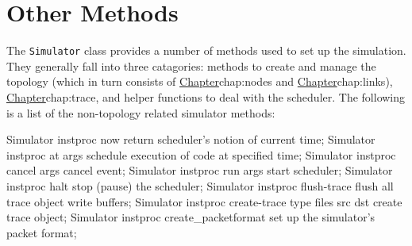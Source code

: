 \section{Other Methods}
\label{sec:other}

The {\tt Simulator} class provides a number of methods used
to set up the simulation.
They generally fall into three catagories:
methods to create and manage the topology 
(which in turn consists of
\href{managing the nodes}{Chapter}{chap:nodes} and
\href{managing the links}{Chapter}{chap:links}),
\href{methods to perform tracing}{Chapter}{chap:trace},
and helper functions to deal with the scheduler.
The following is a list of the non-topology related simulator methods:
\begin{program}
Simulator instproc now {} \; return scheduler's notion of current time;
Simulator instproc at args \; schedule execution of code at specified time;
Simulator instproc cancel args \; cancel event;
Simulator instproc run args \; start scheduler;
Simulator instproc halt {} \; stop (pause) the scheduler;
Simulator instproc flush-trace {} \; flush all trace object write buffers;
Simulator instproc create-trace { type files src dst } \; create trace object;
Simulator instproc create_packetformat \; set up the simulator's packet format;
\end{program}

\endinput
